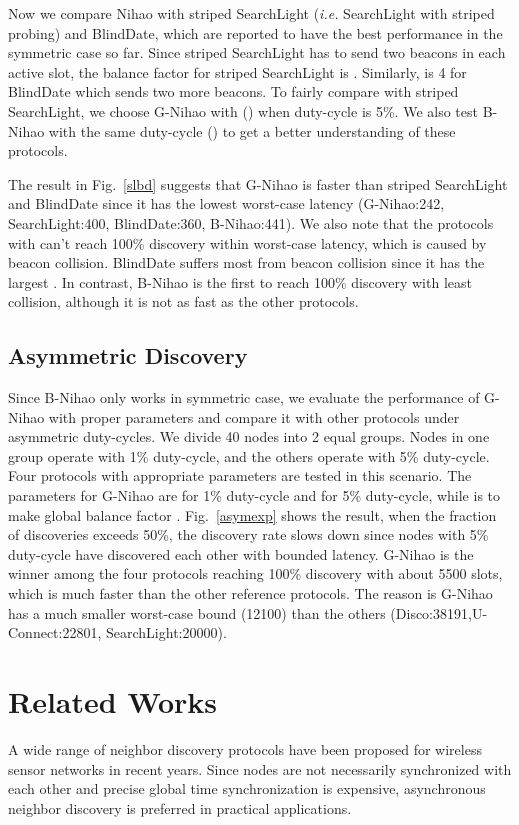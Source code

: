 \documentclass[conference]{IEEEtran}
\begin{document}
Now we compare Nihao with striped SearchLight (\emph{i.e.} SearchLight with striped probing) and BlindDate, which are reported to have the best performance in the symmetric case so far.
Since striped SearchLight has to send two beacons in each active slot, the balance factor for striped SearchLight is .
Similarly,  is 4 for BlindDate which sends two more beacons.
To fairly compare with striped SearchLight, we choose G-Nihao with  () when duty-cycle is 5\%.
We also test B-Nihao with the same duty-cycle () to get a better understanding of these protocols.

The result in Fig.~\ref{slbd} suggests that G-Nihao is faster than striped SearchLight and BlindDate since it has the lowest worst-case latency (G-Nihao:242, SearchLight:400, BlindDate:360, B-Nihao:441).
We also note that the protocols with  can't reach 100\% discovery within worst-case latency, which is caused by beacon collision.
BlindDate suffers most from beacon collision since it has the largest .
In contrast, B-Nihao is the first to reach 100\% discovery with least collision, although it is not as fast as the other protocols.


\subsection{Asymmetric Discovery}
Since B-Nihao only works in symmetric case, we evaluate the performance of G-Nihao with proper parameters and compare it with other protocols under asymmetric duty-cycles.
We divide 40 nodes into 2 equal groups. Nodes in one group operate with 1\% duty-cycle, and the others operate with 5\% duty-cycle.
Four protocols with appropriate parameters are tested in this scenario. 
The parameters for G-Nihao are  for 1\% duty-cycle and  for 5\% duty-cycle, while  is  to make global balance factor .
Fig.~\ref{asymexp} shows the result, when the fraction of discoveries exceeds 50\%,
the discovery rate slows down since nodes with 5\% duty-cycle have discovered each other with bounded latency.
G-Nihao is the winner among the four protocols reaching 100\% discovery with about 5500 slots, which is much faster than the other reference protocols.
The reason is G-Nihao has a much smaller worst-case bound (12100) than the others (Disco:38191,U-Connect:22801, SearchLight:20000).

\section{Related Works}\label{relatedworks}
A wide range of neighbor discovery protocols have been proposed for wireless sensor networks in recent years.
Since nodes are not necessarily synchronized with each other and precise global time synchronization is expensive,
asynchronous neighbor discovery is preferred in practical applications.
\end{document}

